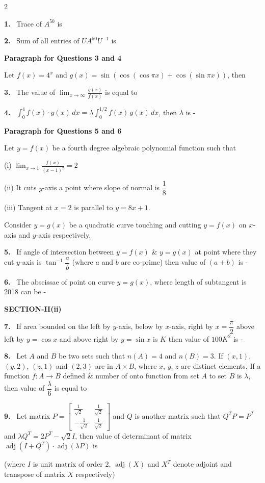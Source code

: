 \documentclass[10pt]{extarticle}
\newcommand{\sect}[1]{\par\smallskip\noindent\textbf{#1}\par}
\newcommand{\qn}[1]{\par\smallskip\noindent\textbf{#1.}~}
\newcommand{\paraq}[2]{\par\smallskip\noindent\textbf{Paragraph for Questions #1 and #2}\par}
\let\oldsect\sect\let\oldparaq\paraq
\renewcommand{\sect}[1]{\Needspace{7\baselineskip}\oldsect{#1}\nopagebreak[4]}
\renewcommand{\paraq}[2]{\Needspace{6\baselineskip}\oldparaq{#1}{#2}\nopagebreak[4]}
\begin{document}
\begin{multicols}{2}
\qn{1} Trace of $A^{50}$ is
\qn{2} Sum of all entries of $UA^{50}U^{-1}$ is
\paraq{3}{4}
Let $f(x)=4^x$ and $g(x)=\sin(\cos(\cos\pi x)+\cos(\sin\pi x))$, then
\qn{3} The value of $\displaystyle\lim_{x\to\infty}\frac{g(x)}{f(x)}$ is equal to
\qn{4} $\displaystyle\int_0^4f(x)\cdot g(x)\,dx=\lambda\int_0^{1/2}f(x)\,g(x)\,dx$, then $\lambda$ is -
\paraq{5}{6}
Let $y=f(x)$ be a fourth degree algebraic polynomial function such that\par
(i) $\displaystyle\lim_{x\to1}\frac{f(x)}{(x-1)^2}=2$\par
(ii) It cuts $y$-axis a point where slope of normal is $\dfrac18$\par
(iii) Tangent at $x=2$ is parallel to $y=8x+1$.\par
Consider $y=g(x)$ be a quadratic curve touching and cutting $y=f(x)$ on $x$-axis and $y$-axis respectively.
\qn{5} If angle of intersection between $y=f(x)$ \& $y=g(x)$ at point where they cut $y$-axis is $\tan^{-1}\dfrac ab$ (where $a$ and $b$ are co-prime) then value of $(a+b)$ is -
\qn{6} The abscissae of point on curve $y=g(x)$, where length of subtangent is 2018 can be -
\sect{SECTION-II(ii)}
\qn{7} If area bounded on the left by $y$-axis, below by $x$-axis, right by $x=\dfrac\pi2$ above left by $y=\cos x$ and above right by $y=\sin x$ is $K$ then value of $100K^2$ is -
\qn{8} Let $A$ and $B$ be two sets such that $n(A)=4$ and $n(B)=3$. If $(x,1)$, $(y,2)$, $(z,1)$ and $(2,3)$ are in $A\times B$, where $x$, $y$, $z$ are distinct elements. If a function $f:A\to B$ defined \& number of onto function from set $A$ to set $B$ is $\lambda$, then value of $\dfrac\lambda6$ is equal to
\qn{9} Let matrix $P=\begin{bmatrix}\frac1{\sqrt2}&\frac1{\sqrt2}\\-\frac1{\sqrt2}&\frac1{\sqrt2}\end{bmatrix}$ and $Q$ is another matrix such that $Q^TP=P^T$ and $\lambda Q^T=2P^T-\sqrt2I$, then value of determinant of matrix $\operatorname{adj}(I+Q^T)\cdot\operatorname{adj}(\lambda P)$ is\par
(where $I$ is unit matrix of order 2, $\operatorname{adj}(X)$ and $X^T$ denote adjoint and transpose of matrix $X$ respectively)
\end{multicols}
\end{document}
